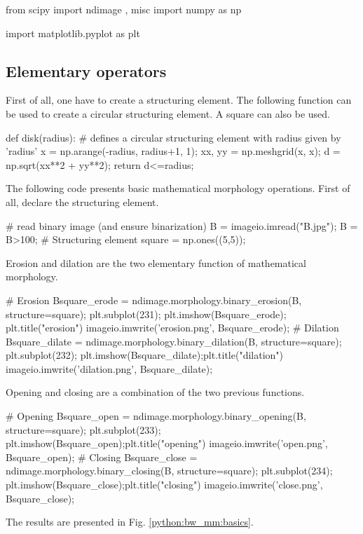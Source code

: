 \def\QRCODE{TB_IPR_TUT.IMG.binary_morphological_reconstruction_pythonqrcode.png}
\def\QRPAGE{http://www.iptutorials.science/tree/master/TB_IPR/TUT.IMG.binary_morphological_reconstruction/python}

\begin{python}
from scipy import ndimage , misc
import numpy as np

import matplotlib.pyplot as plt
\end{python}


\subsection{Elementary operators}
First of all, one have to create a structuring element. The following function can be used to create a circular structuring element. A square can also be used.

\begin{python}
def disk(radius):
    # defines a circular structuring element with radius given by 'radius'
    x = np.arange(-radius, radius+1, 1);
    xx, yy = np.meshgrid(x, x);
    d = np.sqrt(xx**2 + yy**2);
    return d<=radius;
\end{python}

The following code presents basic mathematical morphology operations. First of all, declare the structuring element.
\begin{python}
# read binary image (and ensure binarization)
B = imageio.imread("B.jpg");
B = B>100;
# Structuring element
square = np.ones((5,5));
\end{python}

Erosion and dilation are the two elementary function of mathematical morphology.

\begin{python}
# Erosion
Bsquare_erode = ndimage.morphology.binary_erosion(B, structure=square);
plt.subplot(231);
plt.imshow(Bsquare_erode); plt.title("erosion")
imageio.imwrite('erosion.png', Bsquare_erode);
# Dilation
Bsquare_dilate = ndimage.morphology.binary_dilation(B, structure=square);
plt.subplot(232);
plt.imshow(Bsquare_dilate);plt.title("dilation")
imageio.imwrite('dilation.png', Bsquare_dilate);
\end{python}

Opening and closing are a combination of the two previous functions.

\begin{python}
# Opening
Bsquare_open = ndimage.morphology.binary_opening(B, structure=square);
plt.subplot(233);
plt.imshow(Bsquare_open);plt.title("opening")
imageio.imwrite('open.png', Bsquare_open);
# Closing
Bsquare_close = ndimage.morphology.binary_closing(B, structure=square);
plt.subplot(234);
plt.imshow(Bsquare_close);plt.title("closing")
imageio.imwrite('close.png', Bsquare_close);
\end{python}
The results are presented in Fig. \ref{python:bw_mm:basics}.

